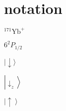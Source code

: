 



\section{notation}

${ }^{171} \mathrm{Yb}^{+}$

$6^2 P_{1 / 2}$

$|\downarrow\rangle$

$\left|\downarrow_z\right\rangle$

$\left|\uparrow\right\rangle$

